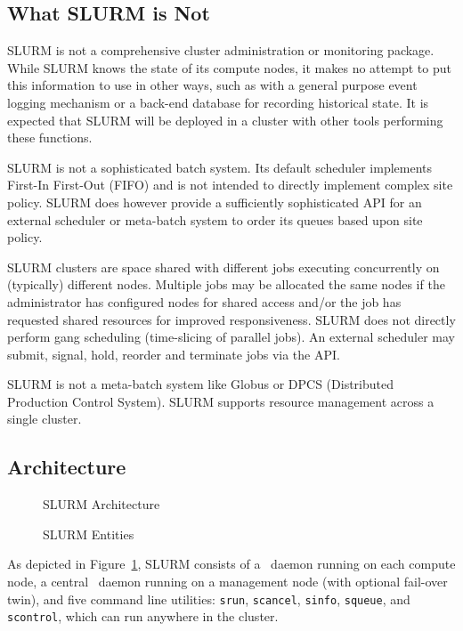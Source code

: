 \subsection{What SLURM is Not}

SLURM is not a comprehensive cluster administration or monitoring package.  
While SLURM knows the state of its compute nodes, it makes no attempt to put
this information to use in other ways, such as with a general purpose event
logging mechanism or a back-end database for recording historical state.
It is expected that SLURM will be deployed in a cluster with other 
tools performing these functions. 

SLURM is not a sophisticated batch system.  Its default scheduler
implements First-In First-Out (FIFO) and is not 
intended to directly implement complex site policy.
SLURM does however provide a sufficiently sophisticated API for an external 
scheduler or meta-batch system to order its queues based upon site policy.

SLURM clusters are space shared with different jobs executing 
concurrently on (typically) different nodes. 
Multiple jobs may be allocated the same nodes 
if the administrator has configured nodes for shared access and/or 
the job has requested shared resources for improved responsiveness.
SLURM does not directly perform gang scheduling (time-slicing 
of parallel jobs). An external scheduler may submit, signal, hold, 
reorder and terminate jobs via the API.

SLURM is not a meta-batch system like Globus\cite{Globus2002}
or DPCS (Distributed Production Control System)\cite{DPCS2002}.  
SLURM supports resource management across a single cluster.

\subsection{Architecture}

\begin{figure}[tb]
\centerline{}
\caption{SLURM Architecture}
\label{arch}
\end{figure}

\begin{figure}[tcb]
\centerline{}
\caption{SLURM Entities}
\label{entities}
\end{figure}


As depicted in Figure~\ref{arch}, SLURM consists of a \slurmd\ daemon
running on each compute node, a central \slurmctld\ daemon running on
a management node (with optional fail-over twin), and five command line
utilities: {\tt srun}, {\tt scancel}, {\tt sinfo}, {\tt squeue}, and 
{\tt scontrol}, which can run anywhere in the cluster.  

